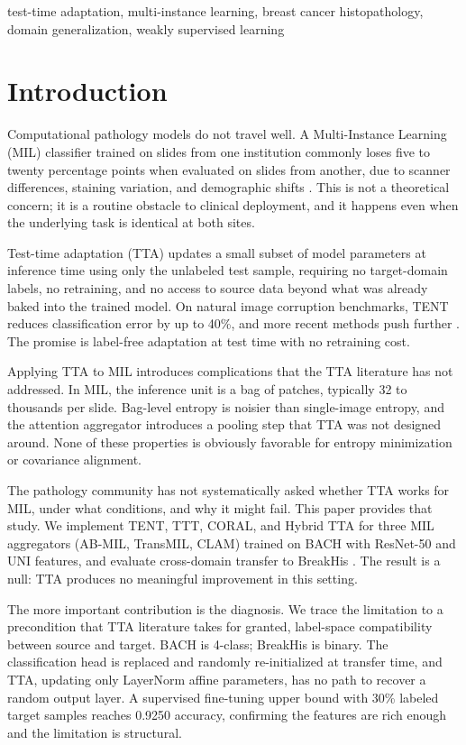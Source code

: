 \documentclass[conference]{IEEEtran}
\begin{document}
\begin{IEEEkeywords}
test-time adaptation, multi-instance learning, breast cancer histopathology, domain generalization, weakly supervised learning
\end{IEEEkeywords}

\section{Introduction}

Computational pathology models do not travel well. A Multi-Instance Learning (MIL) classifier trained on slides from one institution commonly loses five to twenty percentage points when evaluated on slides from another, due to scanner differences, staining variation, and demographic shifts \cite{chen2022scaling, lu2021data}. This is not a theoretical concern; it is a routine obstacle to clinical deployment, and it happens even when the underlying task is identical at both sites.

Test-time adaptation (TTA) updates a small subset of model parameters at inference time using only the unlabeled test sample, requiring no target-domain labels, no retraining, and no access to source data beyond what was already baked into the trained model. On natural image corruption benchmarks, TENT reduces classification error by up to 40\%, and more recent methods push further \cite{niu2023towards, liu2021ttt, wang2022cotta, niu2022eata, yuan2023rotta}. The promise is label-free adaptation at test time with no retraining cost.

Applying TTA to MIL introduces complications that the TTA literature has not addressed. In MIL, the inference unit is a bag of patches, typically 32 to thousands per slide. Bag-level entropy is noisier than single-image entropy, and the attention aggregator introduces a pooling step that TTA was not designed around. None of these properties is obviously favorable for entropy minimization or covariance alignment.

The pathology community has not systematically asked whether TTA works for MIL, under what conditions, and why it might fail. This paper provides that study. We implement TENT, TTT, CORAL, and Hybrid TTA for three MIL aggregators (AB-MIL, TransMIL, CLAM) trained on BACH with ResNet-50 and UNI features, and evaluate cross-domain transfer to BreakHis \cite{spanhol2016dataset}. The result is a null: TTA produces no meaningful improvement in this setting.

The more important contribution is the diagnosis. We trace the limitation to a precondition that TTA literature takes for granted, label-space compatibility between source and target. BACH is 4-class; BreakHis is binary. The classification head is replaced and randomly re-initialized at transfer time, and TTA, updating only LayerNorm affine parameters, has no path to recover a random output layer. A supervised fine-tuning upper bound with 30\% labeled target samples reaches 0.9250 accuracy, confirming the features are rich enough and the limitation is structural.
\end{document}
